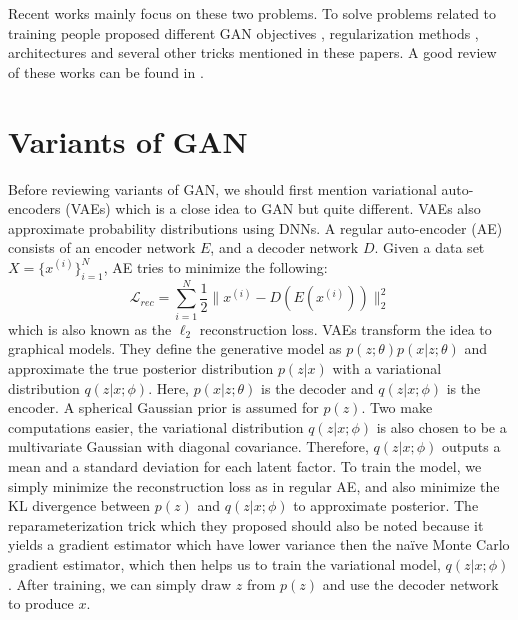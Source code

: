 \documentclass[a4paper,onesided,12pt]{report}
\begin{document}
Recent works mainly focus on these two problems. To solve problems related to training people proposed different GAN objectives \cite{arjovsky2017wasserstein,chen2016infogan,mao2017least,qi2017loss}, regularization methods \cite{gulrajani2017improved,miyato2018spectral,radford2015unsupervised}, architectures \cite{brock2018large,donahue2016adversarial,dumoulin2016adversarially,karras2017progressive,karras2019style,radford2015unsupervised,zhang2018self} and several other tricks mentioned in these papers. A good review of these works can be found in \cite{creswell2018generative,hong2019generative,kurach2018gan}.

\section{Variants of GAN}
\label{sec:variants}

Before reviewing variants of GAN, we should first mention variational auto-encoders (VAEs) \cite{kingma2013auto} which is a close idea to GAN but quite different. VAEs also approximate probability distributions using DNNs. A regular auto-encoder (AE) consists of an encoder network $E$, and a decoder network $D$. Given a data set $X=\{x^{(i)}\}_{i=1}^N$, AE tries to minimize the following:
\begin{equation}
\mathcal{L}_{rec} = \sum_{i=1}^N \frac{1}{2} \| x^{(i)} - D(E(x^{(i)})) \|_2^2
\label{eq:recons}
\end{equation}
which is also known as the $\ell_2$ reconstruction loss. VAEs transform the idea to graphical models. They define the generative model as $p(z; \theta) p( x | z; \theta)$ and approximate the true posterior distribution $p(z|x)$ with a variational distribution $q(z|x;\phi)$. Here, $p(x | z; \theta)$ is the decoder and $q(z|x;\phi)$ is the encoder. A spherical Gaussian prior is assumed for $p(z)$. Two make computations easier, the variational distribution $q(z|x;\phi)$ is also chosen to be a multivariate Gaussian with diagonal covariance. Therefore, $q(z|x;\phi)$ outputs a mean and a standard deviation for each latent factor. To train the model, we simply minimize the reconstruction loss as in regular AE, and also minimize the KL divergence between $p(z)$ and $q(z|x;\phi)$ to approximate posterior. The reparameterization trick which they proposed \cite{kingma2013auto} should also be noted because it yields a gradient estimator which have lower variance then the na\"{i}ve Monte Carlo gradient estimator, which then helps us to train the variational model, $q(z|x;\phi)$. After training, we can simply draw $z$ from $p(z)$ and use the decoder network to produce $x$.
\end{document}
